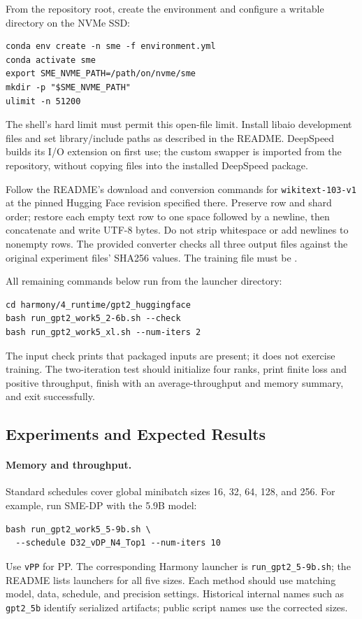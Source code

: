 From the repository root, create the environment and configure a
writable directory on the NVMe SSD:
\begin{verbatim}
conda env create -n sme -f environment.yml
conda activate sme
export SME_NVME_PATH=/path/on/nvme/sme
mkdir -p "$SME_NVME_PATH"
ulimit -n 51200
\end{verbatim}
The shell's hard limit must permit this open-file limit. Install
libaio development files and set library/include paths as described
in the README. DeepSpeed builds its I/O extension on first use;
the custom swapper is imported from the repository, without copying
files into the installed DeepSpeed package.

Follow the README's download and conversion commands for
\texttt{wikitext-103-v1} at the pinned Hugging Face revision
specified there.
Preserve row and shard order; restore each empty text row to one
space followed by a newline, then concatenate and write UTF-8 bytes.
Do not strip whitespace or add newlines to nonempty rows. The
provided converter checks all three output files against the
original experiment files' SHA256 values. The training file must be
.

All remaining commands below run from the launcher directory:
\begin{verbatim}
cd harmony/4_runtime/gpt2_huggingface
bash run_gpt2_work5_2-6b.sh --check
bash run_gpt2_work5_xl.sh --num-iters 2
\end{verbatim}
The input check prints that packaged inputs are present; it does
not exercise training. The two-iteration test should initialize
four ranks, print finite loss and positive throughput, finish with
an average-throughput and memory summary, and exit successfully.

\subsection{Experiments and Expected Results}

\paragraph{Memory and throughput.}
Standard schedules cover global minibatch sizes 16, 32, 64, 128,
and 256. For example, run SME-DP with the 5.9B model:
\begin{verbatim}
bash run_gpt2_work5_5-9b.sh \
  --schedule D32_vDP_N4_Top1 --num-iters 10
\end{verbatim}
Use \texttt{vPP} for PP. The corresponding Harmony launcher is
\texttt{run\_gpt2\_5-9b.sh}; the README lists launchers for all five
sizes. Each method should use matching model, data, schedule, and
precision settings. Historical internal names such as
\texttt{gpt2\_5b} identify serialized artifacts; public script names
use the corrected sizes.

